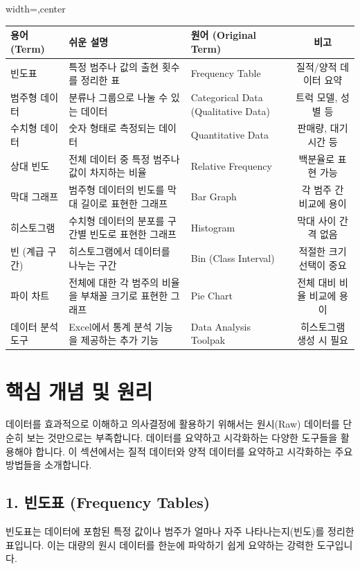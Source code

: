 \documentclass[11pt,a4paper]{article}
\begin{document}
\begin{adjustbox}{width=\textwidth,center}
\begin{tabular}{lllc}
\toprule
\textbf{용어 (Term)} & \textbf{쉬운 설명} & \textbf{원어 (Original Term)} & \textbf{비고} \\
\midrule
빈도표 & 특정 범주나 값의 출현 횟수를 정리한 표 & Frequency Table & 질적/양적 데이터 요약 \\
범주형 데이터 & 분류나 그룹으로 나눌 수 있는 데이터 & Categorical Data (Qualitative Data) & 트럭 모델, 성별 등 \\
수치형 데이터 & 숫자 형태로 측정되는 데이터 & Quantitative Data & 판매량, 대기 시간 등 \\
상대 빈도 & 전체 데이터 중 특정 범주나 값이 차지하는 비율 & Relative Frequency & 백분율로 표현 가능 \\
막대 그래프 & 범주형 데이터의 빈도를 막대 길이로 표현한 그래프 & Bar Graph & 각 범주 간 비교에 용이 \\
히스토그램 & 수치형 데이터의 분포를 구간별 빈도로 표현한 그래프 & Histogram & 막대 사이 간격 없음 \\
빈 (계급 구간) & 히스토그램에서 데이터를 나누는 구간 & Bin (Class Interval) & 적절한 크기 선택이 중요 \\
파이 차트 & 전체에 대한 각 범주의 비율을 부채꼴 크기로 표현한 그래프 & Pie Chart & 전체 대비 비율 비교에 용이 \\
데이터 분석 도구 & Excel에서 통계 분석 기능을 제공하는 추가 기능 & Data Analysis Toolpak & 히스토그램 생성 시 필요 \\
\bottomrule
\end{tabular}
\end{adjustbox}

\newpage
\section*{핵심 개념 및 원리}

데이터를 효과적으로 이해하고 의사결정에 활용하기 위해서는 원시(Raw) 데이터를 단순히 보는 것만으로는 부족합니다. 데이터를 요약하고 시각화하는 다양한 도구들을 활용해야 합니다. 이 섹션에서는 질적 데이터와 양적 데이터를 요약하고 시각화하는 주요 방법들을 소개합니다.

\subsection*{1. 빈도표 (Frequency Tables)}
빈도표는 데이터에 포함된 특정 값이나 범주가 얼마나 자주 나타나는지(빈도)를 정리한 표입니다. 이는 대량의 원시 데이터를 한눈에 파악하기 쉽게 요약하는 강력한 도구입니다.
\end{document}
